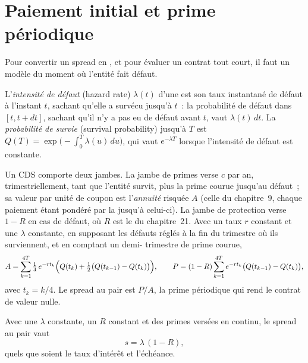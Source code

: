 \section{Paiement initial et prime périodique}

Pour convertir un spread en , et pour évaluer un contrat tout court, il
faut un modèle du moment où l'entité fait défaut.

\begin{definition}\label{def:m2:credit-default-swaps:hazard}
L'\emph{intensité de défaut} (hazard rate) $\lambda(t)$ d'une  est son
taux instantané de défaut à l'instant $t$, sachant qu'elle a survécu jusqu'à $t$~: la
probabilité de défaut dans $[t, t + dt]$, sachant qu'il n'y a pas eu de défaut avant $t$, vaut $\lambda(t)\,dt$. La
\emph{probabilité de survie} (survival probability) jusqu'à $T$ est $Q(T) =
\exp\bigl(-\int_0^T \lambda(u)\,du\bigr)$, qui vaut $e^{-\lambda T}$ lorsque l'intensité
de défaut est constante.
\end{definition}

Un CDS comporte deux jambes. La jambe de primes verse $c$ par an, trimestriellement, tant que
l'entité survit, plus la prime courue jusqu'au défaut~; sa valeur par unité de coupon est
l'\emph{annuité} risquée $A$ (celle du chapitre~9, chaque paiement étant pondéré par la
 jusqu'à celui-ci). La jambe de protection verse $1 - R$ en cas de défaut, où $R$
est le  du chapitre~21. Avec un taux $r$ constant et une  $\lambda$ constante,
en supposant les défauts réglés à la fin du trimestre où ils surviennent, et en comptant un demi-
trimestre de prime courue,
\[
A = \sum_{k=1}^{4T} \tfrac14\, e^{-r t_k}\Bigl(Q(t_k) + \tfrac12\bigl(Q(t_{k-1}) - Q(t_k)\bigr)\Bigr),
\qquad
P = (1-R)\sum_{k=1}^{4T} e^{-r t_k}\bigl(Q(t_{k-1}) - Q(t_k)\bigr),
\]
avec $t_k = k/4$. Le spread au pair est $P/A$, la prime périodique qui rend le contrat
de valeur nulle.

\begin{proposition}\label{prop:m2:credit-default-swaps:triangle}
Avec une  $\lambda$ constante, un  $R$ constant et des primes
versées en continu, le spread au pair vaut
\[
s = \lambda\,(1 - R),
\]
quels que soient le taux d'intérêt et l'échéance.
\end{proposition}

